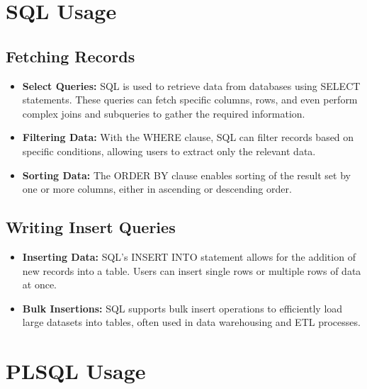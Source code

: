 \documentclass[a4paper,12pt]{report}
\begin{document}
	\section{SQL Usage}
	
	\subsection{Fetching Records}
	\begin{itemize}
		\item \textbf{Select Queries:} SQL is used to retrieve data from databases using SELECT statements. These queries can fetch specific columns, rows, and even perform complex joins and subqueries to gather the required information.
		\item \textbf{Filtering Data:} With the WHERE clause, SQL can filter records based on specific conditions, allowing users to extract only the relevant data.
		\item \textbf{Sorting Data:} The ORDER BY clause enables sorting of the result set by one or more columns, either in ascending or descending order.
	\end{itemize}
	
	\subsection{Writing Insert Queries}
	\begin{itemize}
		\item \textbf{Inserting Data:} SQL's INSERT INTO statement allows for the addition of new records into a table. Users can insert single rows or multiple rows of data at once.
		\item \textbf{Bulk Insertions:} SQL supports bulk insert operations to efficiently load large datasets into tables, often used in data warehousing and ETL processes.
	\end{itemize}
	
	\section{PLSQL Usage}
	
\end{document}
